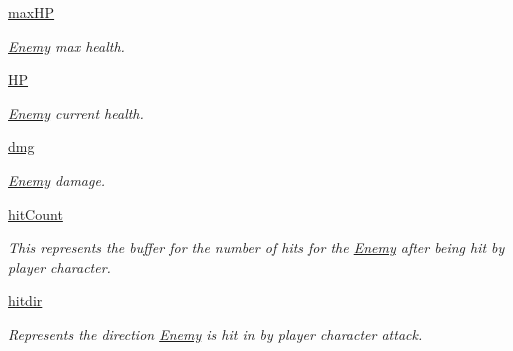 \begin{DoxyCompactItemize}
\mbox{\label{classactor_1_1enemy_1_1_enemy_ad57e864feaa058d6e05344a5131e3c3b}} 
\hyperlink{classactor_1_1enemy_1_1_enemy_ad57e864feaa058d6e05344a5131e3c3b}{max\+HP}
\begin{DoxyCompactList}\small\item\em \hyperlink{classactor_1_1enemy_1_1_enemy}{Enemy} max health. \end{DoxyCompactList}\item 
\mbox{\label{classactor_1_1enemy_1_1_enemy_a628179612c6af830270a9fd49e147bce}} 
\hyperlink{classactor_1_1enemy_1_1_enemy_a628179612c6af830270a9fd49e147bce}{HP}
\begin{DoxyCompactList}\small\item\em \hyperlink{classactor_1_1enemy_1_1_enemy}{Enemy} current health. \end{DoxyCompactList}\item 
\mbox{\label{classactor_1_1enemy_1_1_enemy_a23382d6dec9cbf34c1feec91de95db36}} 
\hyperlink{classactor_1_1enemy_1_1_enemy_a23382d6dec9cbf34c1feec91de95db36}{dmg}
\begin{DoxyCompactList}\small\item\em \hyperlink{classactor_1_1enemy_1_1_enemy}{Enemy} damage. \end{DoxyCompactList}\item 
\hyperlink{classactor_1_1enemy_1_1_enemy_aaa23681089031060de8abdf44956b7d1}{hit\+Count}
\begin{DoxyCompactList}\small\item\em This represents the buffer for the number of hits for the \hyperlink{classactor_1_1enemy_1_1_enemy}{Enemy} after being hit by player character. \end{DoxyCompactList}\item 
\hyperlink{classactor_1_1enemy_1_1_enemy_acc0b053f7922d48e2b76b2a0341c2c0c}{hitdir}
\begin{DoxyCompactList}\small\item\em Represents the direction \hyperlink{classactor_1_1enemy_1_1_enemy}{Enemy} is hit in by player character attack. \end{DoxyCompactList}\item 
\mbox{\label{classactor_1_1enemy_1_1_enemy_aeb8e66f955c0233222186a0b31ffebec}} 

\end{DoxyCompactItemize}
